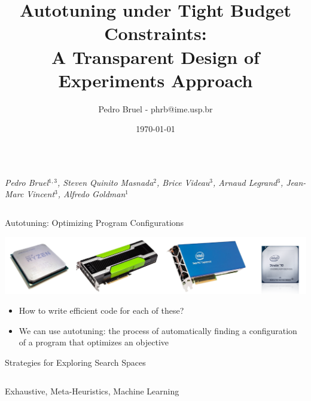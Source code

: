 \documentclass[11pt, compress, aspectratio=169, xcolor={table,usenames,dvipsnames}]{beamer}
\author{Pedro Bruel - phrb@ime.usp.br}
\date{\today}
\title{Autotuning under Tight Budget Constraints:  \\[0.3em] A Transparent Design of Experiments Approach}
\renewcommand\maketitle{}
\begin{document}
\maketitle

\begin{frame}
\begin{columns}
\begin{column}{0.86\columnwidth}
\vspace{-0.2em}
\begin{center}
  {\normalsize
    \textit{\alert{Pedro Bruel}$^{1,3}$, Steven Quinito Masnada$^{2}$, Brice
    Videau$^{3}$, Arnaud Legrand$^{3}$, Jean-Marc Vincent$^{3}$, Alfredo Goldman$^{1}$}
  }
\end{center}
\vspace{-0.8em}
\begin{columns}
\begin{column}[t]{0.5\columnwidth}
\begin{block}{Autotuning: Optimizing Program Configurations}
\begin{center}
\includegraphics[width=.9\columnwidth]{../../../img/architectures.png}
\end{center}

\begin{itemize}
\item How to write \alert{efficient code} for each of these?
\item We can use \alert{autotuning}: the process of \alert{automatically
finding} a \alert{configuration} of a program that optimizes an
\alert{objective}
\end{itemize}
\end{block}

\begin{block}{Strategies for Exploring Search Spaces}
\begin{columns}
\begin{column}{0.59\columnwidth}
\vspace{0.45em}
{\tiny

}
\begin{center}
{\tiny
\colorbox{red!25}{Exhaustive},
\colorbox{green!25}{Meta-Heuristics},
\colorbox{cyan!25}{Machine Learning}
}
\vspace{.5em}
\end{center}
\end{column}


\end{columns}
\end{block}
\end{column}
\end{columns}
\end{column}
\end{columns}
\end{frame}
\end{document}
